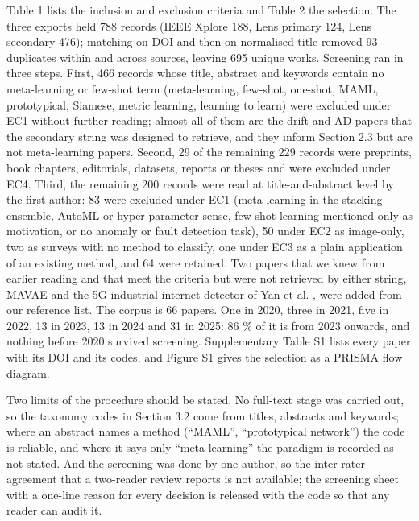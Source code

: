 Table 1 lists the inclusion and exclusion criteria and Table 2 the selection. The three exports held 788 records (IEEE Xplore 188, Lens primary 124, Lens secondary 476); matching on DOI and then on normalised title removed 93 duplicates within and across sources, leaving 695 unique works. Screening ran in three steps. First, 466 records whose title, abstract and keywords contain no meta-learning or few-shot term (meta-learning, few-shot, one-shot, MAML, prototypical, Siamese, metric learning, learning to learn) were excluded under EC1 without further reading; almost all of them are the drift-and-AD papers that the secondary string was designed to retrieve, and they inform Section 2.3 but are not meta-learning papers. Second, 29 of the remaining 229 records were preprints, book chapters, editorials, datasets, reports or theses and were excluded under EC4. Third, the remaining 200 records were read at title-and-abstract level by the first author: 83 were excluded under EC1 (meta-learning in the stacking-ensemble, AutoML or hyper-parameter sense, few-shot learning mentioned only as motivation, or no anomaly or fault detection task), 50 under EC2 as image-only, two as surveys with no method to classify, one under EC3 as a plain application of an existing method, and 64 were retained. Two papers that we knew from earlier reading and that meet the criteria but were not retrieved by either string, MAVAE \citep{moon2023mavae} and the 5G industrial-internet detector of Yan et al. \citep{yan2024fewshot}, were added from our reference list. The corpus is 66 papers. One in 2020, three in 2021, five in 2022, 13 in 2023, 13 in 2024 and 31 in 2025: 86 \% of it is from 2023 onwards, and nothing before 2020 survived screening. Supplementary Table S1 lists every paper with its DOI and its codes, and Figure S1 gives the selection as a PRISMA flow diagram.

Two limits of the procedure should be stated. No full-text stage was carried out, so the taxonomy codes in Section 3.2 come from titles, abstracts and keywords; where an abstract names a method (``MAML'', ``prototypical network'') the code is reliable, and where it says only ``meta-learning'' the paradigm is recorded as not stated. And the screening was done by one author, so the inter-rater agreement that a two-reader review reports is not available; the screening sheet with a one-line reason for every decision is released with the code so that any reader can audit it.


